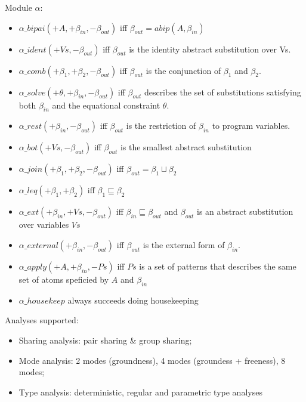 \documentclass[landscape]{slides}
\def\aleq{{\sqsubseteq}}
\newcommand{\alub}  {{\sqcup}}
\begin{document}
 \begin{slide} Module $\alpha$: 
 \begin{itemize} 
\item $\alpha\_bipai(+A,+\beta_{in},-\beta_{out})$ iff
$\beta_{out}=abip(A,\beta_{in})$
\item $\alpha\_ident(+Vs,-\beta_{out})$ iff $\beta_{out}$ is the
identity abstract substitution over Vs. 
\item $\alpha\_comb(+\beta_1,+\beta_2,-\beta_{out})$ iff
$\beta_{out}$ is the conjunction of   $\beta_1$ and $\beta_2$.       
\item $\alpha\_solve(+\theta,+\beta_{in},-\beta_{out})$  iff 
$\beta_{out}$ describes the set of substitutions satisfying 
both $\beta_{in}$ and the equational constraint $\theta$.  
\item $\alpha\_rest(+\beta_{in},-\beta_{out})$ iff $\beta_{out}$ is the
restriction of $\beta_{in}$ to program variables. 
\item $\alpha\_bot(+Vs,-\beta_{out})$ iff $\beta_{out}$ is the
smallest  abstract substitution
\item $\alpha\_join(+\beta_{1},+\beta_{2},-\beta_{out})$ iff 
      $\beta_{out}=\beta_{1}\alub\beta_{2}$
\item $\alpha\_leq(+\beta_{1},+\beta_{2})$ iff
      $\beta_{1}\aleq\beta_{2}$
\item $\alpha\_ext(+\beta_{in},+Vs,-\beta_{out})$ iff
$\beta_{in}\aleq\beta_{out}$ and $\beta_{out}$ is an abstract substitution
over variables $Vs$
\item $\alpha\_external(+\beta_{in},-\beta_{out})$ iff $\beta_{out}$
      is the external form of $\beta_{in}$. 
\item $\alpha\_apply(+A,+\beta_{in},-Ps)$ iff $Ps$ is a set of
patterns that describes the same set of atoms speficied by $A$ and
$\beta_{in}$ 
\item $\alpha\_housekeep$ always succeeds doing housekeeping 
\end{itemize}
\end{slide}

\begin{slide}
Analyses supported:

\begin{itemize}
\item Sharing analysis: pair sharing \& group sharing;
\item Mode analysis: 2 modes (groundness), 4 modes (groundess +
  freeness), 8 modes;
\item Type analysis: deterministic, regular and parametric type
  analyses
\end{itemize}

\end{slide}
\end{document}
